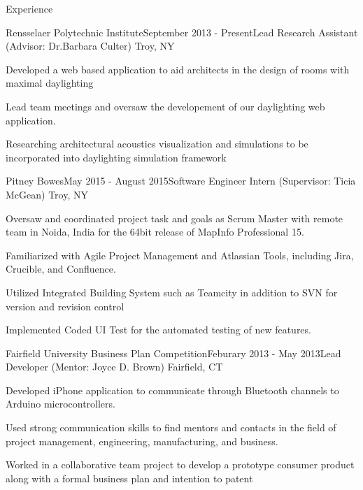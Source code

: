 \documentclass{resume} %
\begin{document}
\begin{rSection}{Experience}
\begin{rSubsection}{Rensselaer Polytechnic Institute}{September 2013 - Present}{Lead Research Assistant (Advisor: Dr.Barbara Culter) }{Troy, NY}
\item Developed a web based application to aid architects in the design of rooms with maximal daylighting
\item Lead team meetings and oversaw the developement of our daylighting web application.
\item Researching architectural acoustics visualization and simulations to be incorporated into daylighting simulation framework
\end{rSubsection}

\begin{rSubsection}{Pitney Bowes}{May 2015 - August 2015}{Software Engineer Intern (Supervisor: Ticia McGean) }{Troy, NY}
\item Oversaw and coordinated project task and goals as Scrum Master with remote team in Noida, India for the 64bit release of MapInfo Professional 15.
\item Familiarized with Agile Project Management and Atlassian Tools, including Jira, Crucible, and Confluence.
\item Utilized Integrated Building System such as Teamcity in addition to SVN for version and revision control
\item Implemented Coded UI Test for the automated testing of new features.  
\end{rSubsection}

\begin{rSubsection}{Fairfield University Business Plan Competition}{Feburary 2013 - May 2013}{Lead Developer (Mentor: Joyce D. Brown) }{Fairfield, CT}
\item Developed iPhone application to communicate through Bluetooth channels to Arduino microcontrollers.
\item Used strong communication skills to find mentors and contacts in the field of project management, engineering, manufacturing, and business.
\item Worked in a collaborative team project to develop a prototype consumer product along with a formal business plan and intention to patent
\end{rSubsection}

\end{rSection}
\end{document}
